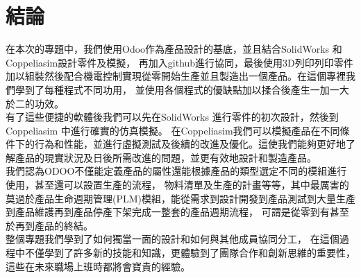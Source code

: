 \chapter{結論}
\renewcommand{\baselinestretch}{10.0} %


\fontsize{14pt}{2.5pt}\sectionef\hspace{12pt}


在本次的專題中，我們使用Odoo作為產品設計的基底，並且結合SolidWorks 和 Coppeliasim設計零件及模擬，
再加入github進行協同，最後使用3D列印列印零件加以組裝然後配合機電控制實現從零開始生產並且製造出一個產品。在這個專裡我們學到了每種程式不同功用，
並使用各個程式的優缺點加以揉合後產生一加一大於二的功效。\\






有了這些便捷的軟體後我們可以先在SolidWorks 進行零件的初次設計，然後到Coppeliasim 中進行確實的仿真模擬。
在Coppeliasim我們可以模擬產品在不同條件下的行為和性能，並進行虛擬測試及後續的改進及優化。這使我們能夠更好地了解產品的現實狀況及日後所需改進的問題，並更有效地設計和製造產品。\\


我們認為ODOO不僅能定義產品的屬性還能根據產品的類型選定不同的模組進行使用，甚至還可以設置生產的流程，
物料清單及生產的計畫等等，其中最厲害的莫過於產品生命週期管理(PLM)模組，能從需求到設計開發到產品測試到大量生產到產品維護再到產品停產下架完成一整套的產品週期流程，
可謂是從零到有甚至於再到產品的終結。\\


整個專題我們學到了如何獨當一面的設計和如何與其他成員協同分工，
在這個過程中不僅學到了許多新的技能和知識，更體驗到了團隊合作和創新思維的重要性，這些在未來職場上班時都將會寶貴的經驗。\\




\newpage

\renewcommand{\baselinestretch}{0.5} %
